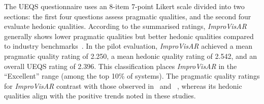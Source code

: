 \documentclass{vgtc}                          %
\begin{document}
\par %
The UEQS questionnaire uses an 8-item 7-point Likert scale divided into two sections: the first four questions assess pragmatic qualities, and the second four evaluate hedonic qualities. According to the summarised ratings, \textit{ImproVisAR} generally shows lower pragmatic qualities but better hedonic qualities compared to industry benchmarks~\cite{schrepp2017construction}. In the pilot evaluation, \textit{ImproVisAR} achieved a mean pragmatic quality rating of 2.250, a mean hedonic quality rating of 2.542, and an overall UEQS rating of 2.396. This classification places \textit{ImproVisAR} in the ``Excellent'' range (among the top 10\% of systems). The pragmatic quality ratings for \textit{ImproVisAR} contrast with those observed in~\cite{rogers2014piano} and ~\cite{banquiero2024color}, whereas its hedonic qualities align with the positive trends noted in these studies.


\end{document}
